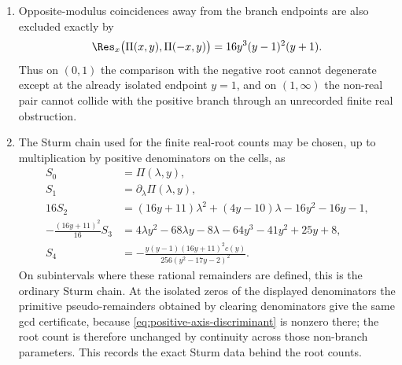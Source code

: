 \begin{lemma}
\begin{enumerate}
\item Opposite-modulus coincidences away from the branch endpoints are also excluded exactly by
\begin{equation}\label{eq:opposite-modulus-resultant}
\Res_x\bigl(\Pi(x,y),\Pi(-x,y)\bigr)
=16y^3(y-1)^2(y+1).
\end{equation}
Thus on \((0,1)\) the comparison with the negative root cannot degenerate except at the already isolated endpoint \(y=1\), and on \((1,\infty)\) the non-real pair cannot collide with the positive branch through an unrecorded finite real obstruction.
\item The Sturm chain used for the finite real-root counts may be chosen, up to multiplication by positive denominators on the cells, as
\begin{align*}
S_0&=\Pi(\lambda,y),\\
S_1&=\partial_\lambda\Pi(\lambda,y),\\
16S_2&=(16y+11)\lambda^2+(4y-10)\lambda-16y^2-16y-1,\\
-\frac{(16y+11)^2}{16}S_3
&=4\lambda y^2-68\lambda y-8\lambda-64y^3-41y^2+25y+8,\\
S_4&=-\frac{y(y-1)(16y+11)^2c(y)}{256(y^2-17y-2)^2}.
\end{align*}
On subintervals where these rational remainders are defined, this is the ordinary Sturm chain.  At the isolated zeros of the displayed denominators the primitive pseudo-remainders obtained by clearing denominators give the same gcd certificate, because \eqref{eq:positive-axis-discriminant} is nonzero there; the root count is therefore unchanged by continuity across those non-branch parameters.  This records the exact Sturm data behind the root counts.
\end{enumerate}
\end{lemma}

